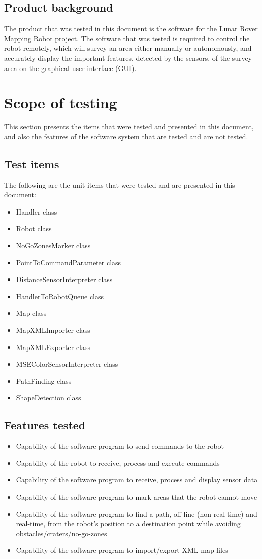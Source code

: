 \documentclass[12pt,a4paper]{article}
\begin{document}
	\subsection{Product background}
   	The product that was tested in this document is the software for the Lunar Rover Mapping Robot project. The software that was tested is required to control the robot remotely, which will survey an area either manually or autonomously, and accurately display the important features, detected by the sensors, of the survey area on the graphical user interface (GUI).
	
	\section{Scope of testing}
	This section presents the items that were tested and presented in this document, and also the features of the software system that are tested and are not tested.
	\subsection{Test items}
	The following are the unit items that were tested and are presented in this document:
	\begin{itemize}
		\item Handler class
		\item Robot class
		\item NoGoZonesMarker class
		\item PointToCommandParameter class
		\item DistanceSensorInterpreter class
        \item HandlerToRobotQueue class
        \item Map class
        \item MapXMLImporter class
        \item MapXMLExporter class
        \item MSEColorSensorInterpreter class
        \item PathFinding class
        \item ShapeDetection class
	\end{itemize}
	\subsection{Features tested}
	\begin{itemize}
		\item Capability of the software program to send commands to the robot
		\item Capability of the robot to receive, process and execute commands
		\item Capability of the software program to receive, process and display sensor data
		\item Capability of the software program to mark areas that the robot cannot move
		\item Capability of the software program to find a path, off line (non real-time) and real-time, from the robot's position to a destination point while avoiding obstacles/craters/no-go-zones
		\item Capability of the software program to import/export XML map files
	\end{itemize}
\end{document}
